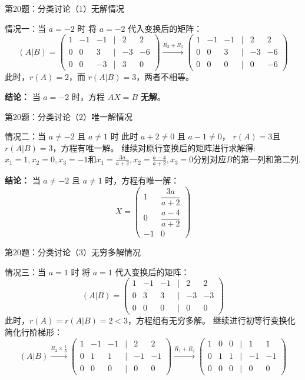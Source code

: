 \documentclass[aspectratio=169]{beamer}
\begin{document}
\begin{frame}{第20题：分类讨论（1）无解情况}
\begin{block}{情况一：当 \(a=-2\) 时}
将 \(a=-2\) 代入变换后的矩阵：
\[
(A|B) = \begin{pmatrix}
1 & -1 & -1 & \vert & 2 & 2 \\
0 & 0 & 3 & \vert & -3 & -6 \\
0 & 0 & -3 & \vert & 3 & 0
\end{pmatrix}
\xrightarrow{R_3+R_2} \begin{pmatrix}
1 & -1 & -1 & \vert & 2 & 2 \\
0 & 0 & 3 & \vert & -3 & -6 \\
0 & 0 & 0 & \vert & 0 & -6
\end{pmatrix}
\]
此时，\(r(A) = 2\)，而 \(r(A|B) = 3\)，两者不相等。

\textbf{结论：} 当 \(a=-2\) 时，方程 \(AX=B\) \textbf{无解}。
\end{block}
\end{frame}

\begin{frame}{第20题：分类讨论（2）唯一解情况}
\begin{block}{情况二：当 \(a\neq-2\) 且 \(a\neq1\) 时}
此时 \(a+2 \neq 0\) 且 \(a-1 \neq 0\)， \(r(A)=3\)且 \(r(A|B)=3\)，方程有唯一解。
继续对原行变换后的矩阵进行求解得:$x_1=1,x_2=0,x_3=-1$和$x_1=\frac{3a}{a+2},x_2=\frac{a-4}{a+2},x_3=0$分别对应$B$的第一列和第二列.

\textbf{结论：} 当 \(a\neq-2\) 且 \(a\neq1\) 时，方程有唯一解：
\[
X = \begin{pmatrix}1 & \dfrac{3a}{a+2} \\[6pt] 0 & \dfrac{a-4}{a+2} \\[6pt] -1 & 0\end{pmatrix}
\]
\end{block}
\end{frame}

\begin{frame}{第20题：分类讨论（3）无穷多解情况}
\begin{block}{情况三：当 \(a=1\) 时}
将 \(a=1\) 代入变换后的矩阵：
\[
(A|B) = \begin{pmatrix}
1 & -1 & -1 & \vert & 2 & 2 \\
0 & 3 & 3 & \vert & -3 & -3 \\
0 & 0 & 0 & \vert & 0 & 0
\end{pmatrix}
\]
此时，\(r(A) = r(A|B) = 2 < 3\)，方程组有无穷多解。
继续进行初等行变换化简化行阶梯形：
\[
(A|B) \xrightarrow{R_2 \times \frac{1}{3}} \begin{pmatrix}
1 & -1 & -1 & \vert & 2 & 2 \\
0 & 1 & 1 & \vert & -1 & -1 \\
0 & 0 & 0 & \vert & 0 & 0
\end{pmatrix}
\xrightarrow{R_1 + R_2} \begin{pmatrix}
1 & 0 & 0 & \vert & 1 & 1 \\
0 & 1 & 1 & \vert & -1 & -1 \\
0 & 0 & 0 & \vert & 0 & 0
\end{pmatrix}
\]
\end{block}
\end{frame}
\end{document}
